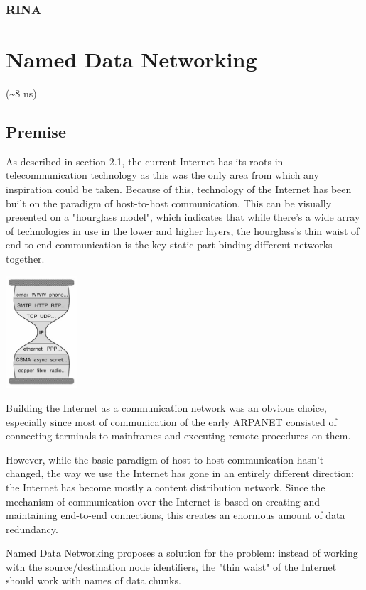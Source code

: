         \subsection{RINA}

\chapter{Named Data Networking}
    (\textasciitilde8 ns)
    \section{Premise}
        As described in section 2.1, the current Internet has its roots in telecommunication technology as this was the only area from which any inspiration could be taken. Because of this, technology of the Internet has been built on the paradigm of host-to-host communication. This can be visually presented on a "hourglass model", which indicates that while there's a wide array of technologies in use in the lower and higher layers, the hourglass's thin waist of end-to-end communication is the key static part binding different networks together.

        \begin{center}\includegraphics[width=0.2\textwidth]{media/ndn_hourglass1.jpg}\end{center}

        Building the Internet as a communication network was an obvious choice, especially since most of communication of the early ARPANET consisted of connecting terminals to mainframes and executing remote procedures on them.

        However, while the basic paradigm of host-to-host communication hasn't changed, the way we use the Internet has gone in an entirely different direction: the Internet has become mostly a content distribution network. Since the mechanism of communication over the Internet is based on creating and maintaining end-to-end connections, this creates an enormous amount of data redundancy.

        Named Data Networking proposes a solution for the problem: instead of working with the source/destination node identifiers, the "thin waist" of the Internet should work with names of data chunks.

